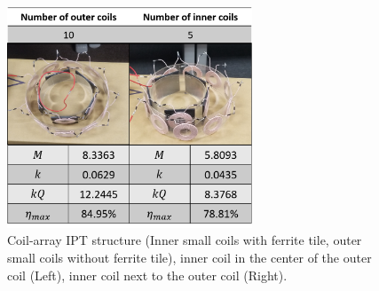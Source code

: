 \begin{figure}[!t]
    \centering
    \includegraphics[width=0.65\textwidth]{images/4_coil_6_10_inner_with_ferrite.png}
    \caption{Coil-array IPT structure (Inner small coils with ferrite tile, outer small coils without ferrite tile), inner coil in the center of the outer coil (Left), inner coil next to the outer coil (Right).}
    \label{fig: coil-array result3}
\end{figure}


\begin{table}[!t]
    \centering
    \caption{Maximum power transfer efficiency of different coil arrangements.}
    \label{table: comparison of the different coil arrangement}
\end{table}

